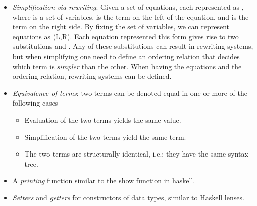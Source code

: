 \begin{itemize}
\begin{itemize}
    \end{itemize}      
    \item \emph{Simplification via rewriting}: Given a set of equations, each represented as , where  is a set of variables,  is the term on the left of the equation, and  is the term on the right side. By fixing the set of variables, we can represent equations as  (L,R). Each equation represented this form gives rise to two substitutions  and . Any of these substitutions can result in rewriting systems, but when simplifying one need to define an ordering relation that decides which term is \emph{simpler} than the other. When having the equations and the ordering relation, rewriting systems can be defined. 
    \item \emph{Equivalence of terms}: two terms can be denoted equal in one or more of the following cases 
    \begin{itemize}
        \item Evaluation of the two terms yields the same value. 
        \item Simplification of the two terms yield the same term. 
        \item The two terms are structurally identical, i.e.: they have the same syntax tree. 
    \end{itemize}
    \item A \emph{printing} function similar to the show function in haskell. 
    \item \emph{Setters} and \emph{getters} for constructors of data types, similar to Haskell lenses. 
\end{itemize}



